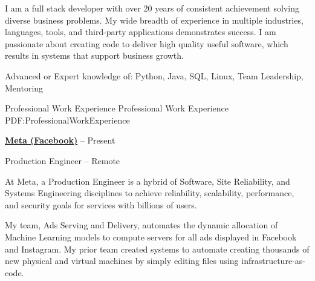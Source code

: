 \documentclass[letterpaper,MMMMyyyy,nonstopmode]{simpleresumecv}
\begin{document}
\begin{Body}
I am a full stack developer with over 20 years of consistent achievement solving diverse business problems. 
My wide breadth of experience in multiple industries, languages, tools, and third-party applications demonstrates success. 
I am passionate about creating code to deliver high quality useful software, which results in systems that support business growth.
\iffalse
\Entry
Full Stack/Backend Java architect, developer, and consultant, specializing in Java/Oracle/JavaScript
solutions and integrations.
\fi
\Gap
Advanced or Expert knowledge of: Python, Java, SQL, Linux, Team Leadership, Mentoring
\iffalse
\Gap
\textit{Business Specialties}: Agile team leadership, customer-focused development, mentoring, requirements gathering and analysis, technical liaison, systems integration, business intelligence
\fi

\Section
{Professional\newline
Work Experience}
{Professional Work Experience}
{PDF:ProfessionalWorkExperience}

\Entry
\href{https://engineering.fb.com/category/production-engineering/}
{\textbf{Meta (Facebook)}}
\hfill
{} --
Present

Production Engineer -- Remote

\begin{Detail}

At Meta, a Production Engineer is a hybrid of Software, Site Reliability, and Systems Engineering disciplines 
to achieve reliability, scalability, performance, and security goals for services with billions of users.

\Gap

My team, Ads Serving and Delivery, automates the dynamic allocation of Machine Learning models to compute servers for all ads displayed in Facebook and Instagram.
My prior team created systems to automate creating thousands of new physical and virtual machines by simply editing files using infrastructure-as-code.


\end{Detail}
\end{Body}
\end{document}
